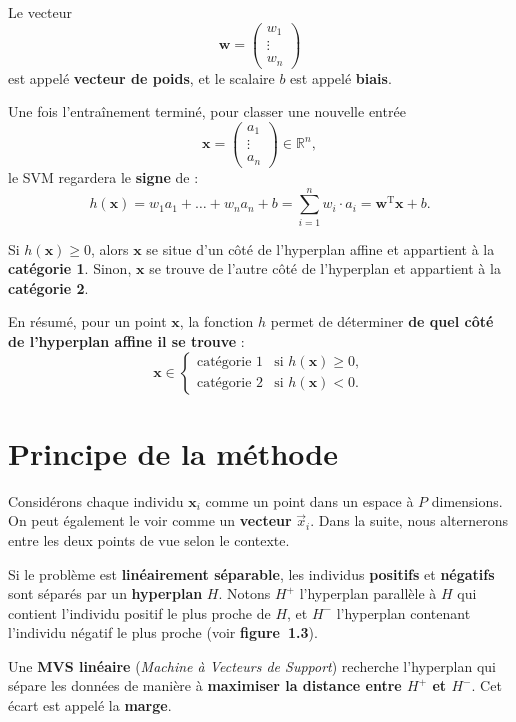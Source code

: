 Le vecteur 
\[
\mathbf{w} =
\begin{pmatrix}
w_1\\
\vdots\\
w_n
\end{pmatrix}
\]
est appelé \textbf{vecteur de poids}, et le scalaire \(b\) est appelé \textbf{biais}.

Une fois l’entraînement terminé, pour classer une nouvelle entrée
\[
\mathbf{x} =
\begin{pmatrix}
a_1\\
\vdots\\
a_n
\end{pmatrix} \in \mathbb{R}^n,
\]
le SVM regardera le \textbf{signe} de :
\[
h(\mathbf{x}) = w_1 a_1 + \dots + w_n a_n + b = \sum_{i=1}^{n} w_i \cdot a_i = \mathbf{w}^\mathrm{T} \mathbf{x} + b.
\]

Si \(h(\mathbf{x}) \ge 0\), alors \(\mathbf{x}\) se situe d’un côté de
l’hyperplan affine et appartient à la \textbf{catégorie 1}.  
Sinon, \(\mathbf{x}\) se trouve de l’autre côté de l’hyperplan et appartient à
la \textbf{catégorie 2}.

En résumé, pour un point \(\mathbf{x}\), la fonction \(h\) permet de déterminer
\textbf{de quel côté de l’hyperplan affine il se trouve} :
\[
\mathbf{x} \in
\begin{cases}
\text{catégorie 1} & \text{si } h(\mathbf{x}) \ge 0,\\
\text{catégorie 2} & \text{si } h(\mathbf{x}) < 0.
\end{cases}
\]




\section{Principe de la méthode}
Considérons chaque individu \(\mathbf{x}_i\) comme un point dans un espace à \(P\)
dimensions. On peut également le voir comme un \textbf{vecteur} \(\vec{x}_i\). Dans
la suite, nous alternerons entre les deux points de vue selon le contexte.

Si le problème est \textbf{linéairement séparable}, les individus \textbf{positifs} et
\textbf{négatifs} sont séparés par un \textbf{hyperplan} \(H\).  
Notons \(H^+\) l’hyperplan parallèle à \(H\) qui contient l’individu positif le plus
proche de \(H\), et \(H^-\) l’hyperplan contenant l’individu négatif le plus proche
(voir \textbf{figure~1.3}).

Une \textbf{MVS linéaire} (\textit{Machine à Vecteurs de Support}) recherche
l’hyperplan qui sépare les données de manière à \textbf{maximiser la distance entre
\(H^+\) et \(H^-\)}. Cet écart est appelé la \textbf{marge}.

